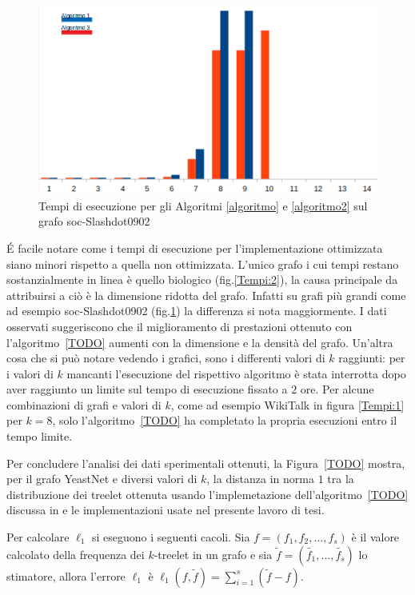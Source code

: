 \begin{figure}[htbp]
	\includegraphics[width=15.4cm]{capitolo4/tempiSOC}
	\caption{Tempi di esecuzione per gli Algoritmi \ref{algoritmo} e \ref{algoritmo2} sul grafo soc-Slashdot0902}
	\label{Tempi:4}
\end{figure}

É facile notare come i tempi di esecuzione per l'implementazione ottimizzata siano minori rispetto a quella non ottimizzata.
L'unico grafo i cui tempi restano sostanzialmente in linea è quello biologico (fig.\ref{Tempi:2}), la causa principale da attribuirsi a ciò è la dimensione ridotta del grafo. 
Infatti su grafi più grandi come ad esempio soc-Slashdot0902 (fig.\ref{Tempi:4}) la differenza si nota maggiormente. 
I dati osservati suggeriscono che il miglioramento di prestazioni ottenuto con l'algoritmo~\ref{TODO} aumenti con la dimensione e la densità del grafo. %
Un'altra cosa che si può notare vedendo i grafici, sono i differenti valori di $ k $ raggiunti: per i valori di $k$ mancanti l'esecuzione del rispettivo algoritmo è stata interrotta dopo aver raggiunto un limite sul tempo di esecuzione fissato a $2$ ore.
Per alcune combinazioni di grafi e valori di $k$, come ad esempio WikiTalk in figura \ref{Tempi:1} per $ k=8$, solo l'algoritmo~\ref{TODO} ha completato la propria esecuzioni entro il tempo limite.

Per concludere l'analisi dei dati sperimentali ottenuti,
la Figura~\ref{TODO} mostra, per il grafo YeastNet e diversi valori di $k$, la distanza in norma $1$ tra 
la distribuzione dei treelet ottenuta usando l'implemetazione dell'algoritmo~\ref{TODO} discussa in \cite{TODO} e le implementazioni usate nel presente lavoro di tesi.

Per calcolare $ \ell_1 $ si eseguono i seguenti cacoli. 
Sia $ f=(f_1,f_2,\dots,f_s) $ è il valore calcolato della frequenza dei $ k $-treelet in un grafo e sia $ \tilde{f}=(\tilde{f_1},\dots,\tilde{f_s}) $ lo stimatore, allora l'errore $ \ell_1 $ è $ \ell_1(f,\tilde{f}) = \sum_{i=1}^{s}{ (\tilde{f}-f)}$.


